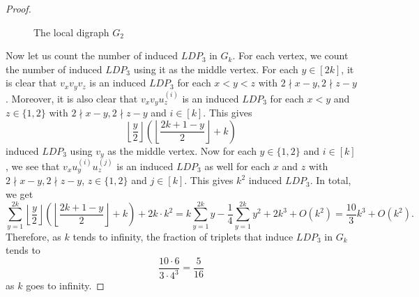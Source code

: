 \documentclass[reqno,11pt]{amsart}
\numberwithin{equation}{section}
\theoremstyle{definition}
\theoremstyle{remark}
\begin{document}
\begin{proof}
\begin{figure}[h]
\begin{center}
    \end{center}
    \caption{The local digraph $G_2$}
    \label{fig:G2}
    \end{figure}

    Now let us count the number of induced $LDP_3$ in $G_k$.
    For each vertex, we count the number of induced $LDP_3$ using it as the middle vertex.
    For each $y\in[2k]$, it is clear that $v_xv_yv_z$ is an induced $LDP_3$ for each $x<y<z$ with $2\nmid x-y, 2\nmid z-y$.
    Moreover, it is also clear that $v_xv_yu_z^{(i)}$ is an induced $LDP_3$ for each $x<y$ and $z\in\{1,2\}$ with $2\nmid x-y, 2\nmid z-y$ and $i\in[k]$.
    This gives
    \[\left\lfloor\frac{y}{2}\right\rfloor\left(\left\lfloor\frac{2k+1-y}{2}\right\rfloor+k\right)\]
    induced $LDP_3$ using $v_y$ as the middle vertex.
    Now for each $y\in\{1,2\}$ and $i\in[k]$, we see that $v_xu^{(i)}_yu^{(j)}_z$ is an induced $LDP_3$ as well for each $x$ and $z$ with  $2\nmid x-y, 2\nmid z-y$, $z\in\{1,2\}$ and $j\in[k]$.
    This gives $k^2$ induced $LDP_3$.
    In total, we get
    \[\sum_{y=1}^{2k}\left\lfloor\frac{y}{2}\right\rfloor\left(\left\lfloor\frac{2k+1-y}{2}\right\rfloor+k\right)+2k\cdot k^2 = k\sum_{y=1}^{2k}y-\frac{1}{4}\sum_{y=1}^{2k}y^2+2k^3+O(k^2)=\frac{10}{3}k^3+O(k^2).\]
    Therefore, as $k$ tends to infinity, the fraction of triplets that induce $LDP_3$ in $G_k$ tends to 
    \[\frac{10\cdot 6}{3\cdot 4^3}= \frac{5}{16}\]
    as $k$ goes to infinity.
    

\end{proof}
\end{document}
